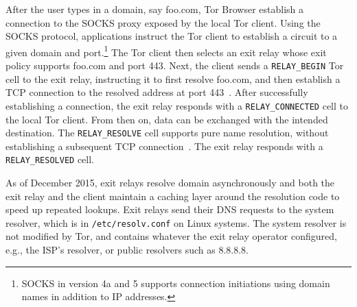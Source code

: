 After the user types in a domain, say foo.com, Tor Browser establish a
connection to the SOCKS proxy exposed by the local Tor client.  Using the SOCKS
protocol, applications instruct the Tor client to establish a circuit to a given
domain and port.\footnote{SOCKS in version 4a and 5 supports connection
initiations using domain names in addition to IP addresses.} The Tor client then
selects an exit relay whose exit policy supports foo.com and port 443.  Next,
the client sends a \texttt{RELAY\_BEGIN} Tor cell to the exit relay, instructing
it to first resolve foo.com, and then establish a TCP connection to the resolved
address at port 443~\cite[\S~6.2]{tor-spec}.  After successfully establishing a
connection, the exit relay responds with a \texttt{RELAY\_CONNECTED} cell to the
local Tor client.  From then on, data can be exchanged with the intended
destination.  The \texttt{RELAY\_RESOLVE} cell supports pure name resolution,
without establishing a subsequent TCP connection~\cite[\S~6.4]{tor-spec}.  The
exit relay responds with a \texttt{RELAY\_RESOLVED} cell.

As of December 2015, exit relays resolve domain asynchronously and both the exit
relay and the client maintain a caching layer around the resolution code to
speed up repeated lookups.  Exit relays send their DNS requests to the system
resolver, which is in \texttt{/etc/resolv.conf} on Linux systems.  The system
resolver is not modified by Tor, and contains whatever the exit relay operator
configured, e.g., the ISP's resolver, or public resolvers such as 8.8.8.8.
